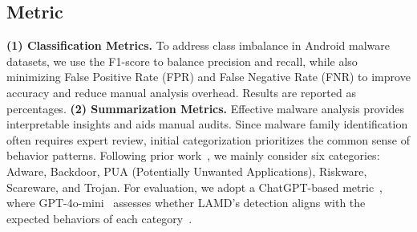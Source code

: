 \subsection{Metric}
\textbf{(1) Classification Metrics.} To address class imbalance in Android malware datasets, we use the F1-score to balance precision and recall, while also minimizing False Positive Rate (FPR) and False Negative Rate (FNR) to improve accuracy and reduce manual analysis overhead. Results are reported as percentages. \textbf{(2) Summarization Metrics.} Effective malware analysis provides interpretable insights and aids manual audits. Since malware family identification often requires expert review, initial categorization prioritizes the common sense of behavior patterns. Following prior work~\cite{malcategory}, we mainly consider six categories: Adware, Backdoor, PUA (Potentially Unwanted Applications), Riskware, Scareware, and Trojan. For evaluation, we adopt a ChatGPT-based metric~\cite{llm4codeanalysis, gptmetric1, gptmetric2}, where GPT-4o-mini~\cite{openai} assesses whether LAMD’s detection aligns with the expected behaviors of each category~\cite{humaneval}.




